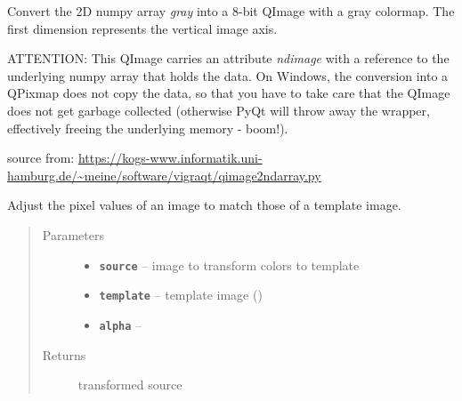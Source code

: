 \documentclass[letterpaper,10pt,english]{sphinxmanual}
\begin{document}

\begin{fulllineitems}
\label{RRtoolbox.lib:RRtoolbox.lib.image.gray2qi}
Convert the 2D numpy array \emph{gray} into a 8-bit QImage with a gray
colormap.  The first dimension represents the vertical image axis.

ATTENTION: This QImage carries an attribute \emph{ndimage} with a
reference to the underlying numpy array that holds the data. On
Windows, the conversion into a QPixmap does not copy the data, so
that you have to take care that the QImage does not get garbage
collected (otherwise PyQt will throw away the wrapper, effectively
freeing the underlying memory - boom!).

source from: \href{https://kogs-www.informatik.uni-hamburg.de/~meine/software/vigraqt/qimage2ndarray.py}{https://kogs-www.informatik.uni-hamburg.de/\textasciitilde{}meine/software/vigraqt/qimage2ndarray.py}

\end{fulllineitems}


\begin{fulllineitems}
\label{RRtoolbox.lib:RRtoolbox.lib.image.hist_match}
Adjust the pixel values of an image to match those of a template image.
\begin{quote}\begin{description}
\item[{Parameters}] \leavevmode\begin{itemize}
\item {} 
\textbf{\texttt{source}} -- image to transform colors to template

\item {} 
\textbf{\texttt{template}} -- template image ()

\item {} 
\textbf{\texttt{alpha}} -- 

\end{itemize}

\item[{Returns}] \leavevmode
transformed source

\end{description}\end{quote}

\end{fulllineitems}
\end{document}
